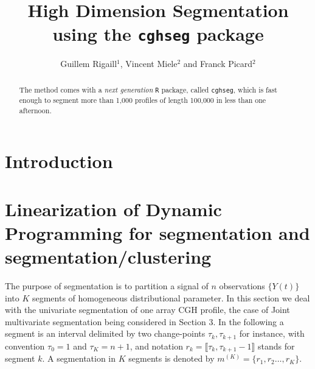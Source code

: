 \documentclass{llncs}
\newcommand{\soft}{\texttt{cghseg}}
\begin{document}
\title{High Dimension Segmentation using the \texttt{cghseg} package}
%
%
\author{Guillem Rigaill$^1$, Vincent Miele$^2$ and Franck Picard$^2$}
%
%
%

\maketitle   

\begin{abstract}
The method comes with a {\it next generation} \texttt{R} package, called \soft, which is fast enough to segment more than 1,000 profiles of length 100,000 in less than one afternoon.

\keywords{}
\end{abstract}

\section{Introduction}
\section{Linearization of Dynamic Programming for segmentation and segmentation/clustering} 

The purpose of segmentation is to partition a signal of $n$ observations $\{Y(t)\}$ into $K$ segments of homogeneous distributional parameter. In this section we deal with the univariate segmentation of one array CGH profile, the case of Joint multivariate segmentation being considered in Section 3. In the following a segment is an interval delimited by two change-points $\tau_k, \tau_{k+1}$ for instance,  with convention $\tau_0 = 1$ and $\tau_K = n+1$, and notation $r_k=\llbracket \tau_k, \tau_{k+1} -1\rrbracket$ stands for segment $k$. A segmentation in $K$ segments is denoted by $m^{(K)} = \{r_1, r_2 \ldots, r_K\}$.
\end{document}
